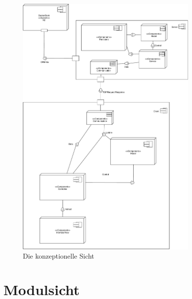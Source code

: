 \documentclass[fontsize=12pt,paper=a4,twoside]{scrartcl}
\begin{document}
\newpage

\begin{figure}[H]
\begin{center}
  \includegraphics[width=340px]{UML/KonzeptionelleSicht.pdf}
  \caption{Die konzeptionelle Sicht}
  \label{fig:boat1}
\end{center}
\end{figure}


\section{Modulsicht} \label{sec:modulsicht}
\end{document}
